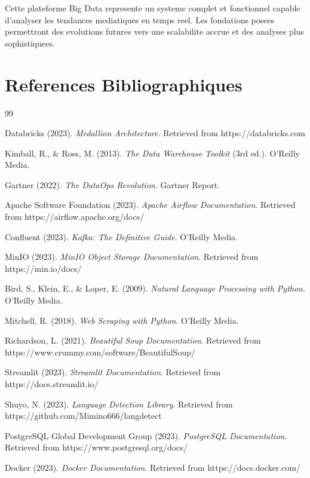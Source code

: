\documentclass[12pt,a4paper]{report}
\begin{document}
Cette plateforme Big Data represente un systeme complet et fonctionnel capable d'analyser les tendances mediatiques en temps reel. Les fondations posees permettront des evolutions futures vers une scalabilite accrue et des analyses plus sophistiquees.

\chapter*{References Bibliographiques}

\begin{thebibliography}{99}

 Databricks (2023). \textit{Medallion Architecture}. Retrieved from https://databricks.com

 Kimball, R., \& Ross, M. (2013). \textit{The Data Warehouse Toolkit} (3rd ed.). O'Reilly Media.

 Gartner (2022). \textit{The DataOps Revolution}. Gartner Report.

 Apache Software Foundation (2023). \textit{Apache Airflow Documentation}. Retrieved from https://airflow.apache.org/docs/

 Confluent (2023). \textit{Kafka: The Definitive Guide}. O'Reilly Media.

 MinIO (2023). \textit{MinIO Object Storage Documentation}. Retrieved from https://min.io/docs/

 Bird, S., Klein, E., \& Loper, E. (2009). \textit{Natural Language Processing with Python}. O'Reilly Media.

 Mitchell, R. (2018). \textit{Web Scraping with Python}. O'Reilly Media.

 Richardson, L. (2021). \textit{Beautiful Soup Documentation}. Retrieved from https://www.crummy.com/software/BeautifulSoup/

 Streamlit (2023). \textit{Streamlit Documentation}. Retrieved from https://docs.streamlit.io/

 Shuyo, N. (2023). \textit{Language Detection Library}. Retrieved from https://github.com/Mimino666/langdetect

 PostgreSQL Global Development Group (2023). \textit{PostgreSQL Documentation}. Retrieved from https://www.postgresql.org/docs/

 Docker (2023). \textit{Docker Documentation}. Retrieved from https://docs.docker.com/

\end{thebibliography}
\end{document}

